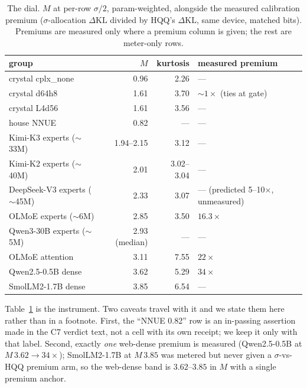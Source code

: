 \documentclass[11pt]{article}
\newcommand{\dkl}{\ensuremath{\Delta\mathrm{KL}}}
\begin{document}
\begin{table}[t]
\centering
\caption{The dial. $M$ at per-row $\sigma/2$, param-weighted, alongside the
measured calibration premium ($\sigma$-allocation \dkl{} divided by HQQ's
\dkl{}, same device, matched bits). Premiums are measured only where a premium
column is given; the rest are meter-only rows.}
\label{tab:dial}
\begin{tabular}{lrrl}
\toprule
group & $M$ & kurtosis & measured premium \\
\midrule
crystal cplx\_none            & 0.96 & 2.26 & --- \\ %
crystal d64h8                 & 1.61 & 3.70 & $\sim 1\times$ (ties at gate) \\ %
crystal L4d56                 & 1.61 & 3.56 & --- \\ %
house NNUE                    & 0.82 & ---  & --- \\ %
Kimi-K3 experts ($\sim$33M)   & 1.94--2.15 & 3.12 & --- \\ %
Kimi-K2 experts ($\sim$40M)   & 2.01 & 3.02--3.04 & --- \\ %
DeepSeek-V3 experts ($\sim$45M) & 2.33 & 3.07 & --- (predicted 5--10$\times$, unmeasured) \\ %
OLMoE experts ($\sim$6M)      & 2.85 & 3.50 & $16.3\times$ \\ %
Qwen3-30B experts ($\sim$5M)  & 2.93 (median) & --- & --- \\ %
OLMoE attention               & 3.11 & 7.55 & $22\times$ \\ %
Qwen2.5-0.5B dense            & 3.62 & 5.29 & $34\times$ \\ %
SmolLM2-1.7B dense            & 3.85 & 6.54 & --- \\ %
\bottomrule
\end{tabular}
\end{table}

Table~\ref{tab:dial} is the instrument. Two caveats travel with it and we state
them here rather than in a footnote. First, the ``NNUE 0.82'' row is an
in-passing assertion made in the C7 verdict text, not a cell with its own
receipt; we keep it only with that label. %
Second, exactly \emph{one} web-dense premium is measured
(Qwen2.5-0.5B at $M\,3.62 \to 34\times$); SmolLM2-1.7B at $M\,3.85$ was metered
but never given a $\sigma$-vs-HQQ premium arm, so the web-dense band is
$3.62$--$3.85$ in $M$ with a single premium anchor.
\end{document}
